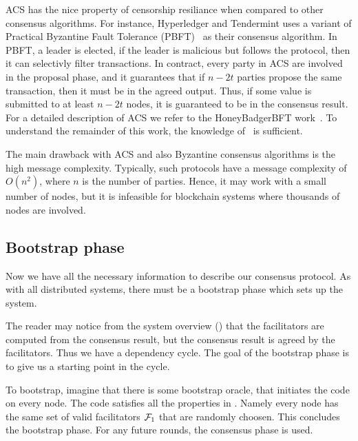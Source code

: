 ACS has the nice property of censorship resiliance when compared to other consensus algorithms.
For instance, Hyperledger and Tendermint uses a variant of Practical Byzantine Fault Tolerance (PBFT)~\cite{castro1999practical} as their consensus algorithm.
In PBFT, a leader is elected, if the leader is malicious but follows the protocol, then it can selectivly filter transactions.
In contract, every party in ACS are involved in the proposal phase,
and it guarantees that if $n - 2t$ parties propose the same transaction, then it must be in the agreed output.
Thus, if some value is submitted to at least $n - 2t$ nodes, it is guaranteed to be in the consensus result.
For a detailed description of ACS we refer to the HoneyBadgerBFT work~\cite{miller2016honey}.
To understand the remainder of this work, the knowledge of~ is sufficient.

The main drawback with ACS and also Byzantine consensus algorithms is the high message complexity.
Typically, such protocols have a message complexity of $O(n^2)$, where $n$ is the number of parties.
Hence, it may work with a small number of nodes,
but it is infeasible for blockchain systems where thousands of nodes are involved.




\subsection{Bootstrap phase}
\label{sec:bootstrap}
Now we have all the necessary information to describe our consensus protocol.
As with all distributed systems, there must be a bootstrap phase which sets up the system.

The reader may notice from the system overview () that the facilitators are computed from the consensus result,
but the consensus result is agreed by the facilitators.
Thus we have a dependency cycle.
The goal of the bootstrap phase is to give us a starting point in the cycle.

To bootstrap, imagine that there is some bootstrap oracle, that initiates the code on every node.
The code satisfies all the properties in .
Namely every node has the same set of valid facilitators $\mathcal{F}_1$ that are randomly choosen.
This concludes the bootstrap phase.
For any future rounds, the consensus phase is used.

